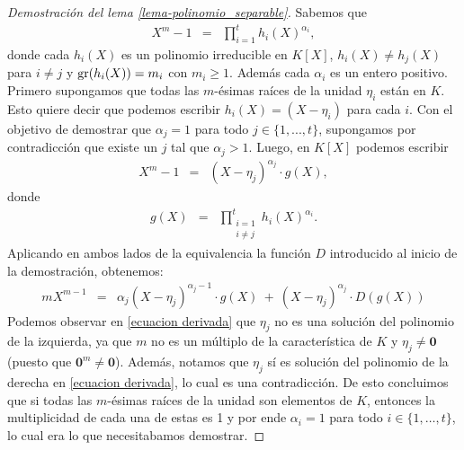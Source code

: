 \documentclass[10pt]{article}
\newcommand{\0}{\mathbf{0}}
\newcommand{\1}{\mathbf{1}}
\newcommand{\+}{\oplus}
\newcommand{\comentarioin}[1]{}
\theoremstyle{remark}
\theoremstyle{remark}
\newcommand{\grado}{{\rm gr}}
\begin{document}
\begin{proof}[Demostración del lema \ref{lema-polinomio_separable}]
Sabemos que 
\begin{eqnarray*}
		X^m-1 & = & \prod_{i=1}^{t}h_i(X)^{\alpha_i}, 
		\end{eqnarray*}
donde cada $h_i(X)$ es un polinomio irreducible en $K[X]$, $h_i(X)\neq h_j(X)$ para $i\neq j$ y $\grado(h_i(X))=m_i$ con $m_i \geq 1$. Además cada $\alpha_i$ es un entero positivo.
Primero supongamos que todas las $m$-ésimas raíces de la unidad
$\eta_i$ están en $K$. Esto quiere decir que podemos escribir
$h_i(X)=(X-\eta_i)$ para cada $i$. Con el objetivo de demostrar que
$\alpha_j = 1$ para todo $j\in\{1,...,t\}$, supongamos por
contradicción que existe un $j$ tal que $\alpha_j>1$. Luego, en $K[X]$
podemos escribir
		\begin{eqnarray*}
			 X^{m}-1  &=& (X-\eta_j)^{\alpha_j}\cdot g(X),
	\end{eqnarray*}
	        donde
                \begin{eqnarray*}
			 g(X) &=& \prod_{\substack{i=1\\ i\neq j}}^{t}h_i(X)^{\alpha_i}.
	\end{eqnarray*}
                Aplicando en ambos lados de la equivalencia la función $D$ introducido al inicio de la demostración, obtenemos:
	\begin{eqnarray}
		m X^{m-1} & = & \alpha_j (X-\eta_j)^{\alpha_j -1}\cdot g(X)\ + \ (X-\eta_j)^{\alpha_j}\cdot D(g(X))\label{ecuacion derivada} 
		\end{eqnarray}
	Podemos observar en \eqref{ecuacion derivada} que $\eta_j$ no es una solución del polinomio de la izquierda, ya que $m$ no es un múltiplo de la característica de $K$
        y $\eta_j\neq \0$ (puesto que $\0^m\neq \0$). Además, notamos que $\eta_j$ sí es solución del polinomio de la derecha en \eqref{ecuacion derivada}, lo cual es una contradicción.   
	De esto concluimos que si todas las $m$-ésimas raíces de la unidad son elementos de $K$, entonces la multiplicidad de cada una de estas es 1 y por ende $\alpha_i = 1$ para todo $i \in \{1, \ldots, t\}$, lo cual era lo que necesitabamos demostrar.
        

\end{proof}
\end{document}
